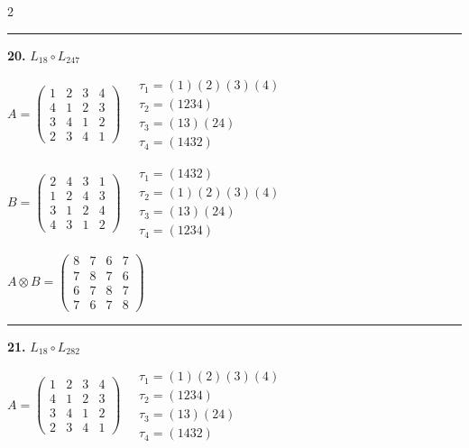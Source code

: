 \begin{multicols}{2}
\vspace{0.3em}
\hrule
\vspace{0.3em}

\noindent\textbf{20.} $L_{18} \circ L_{247}$

$A = \begin{pmatrix} 1 & 2 & 3 & 4 \\ 4 & 1 & 2 & 3 \\ 3 & 4 & 1 & 2 \\ 2 & 3 & 4 & 1 \end{pmatrix} \quad \begin{matrix} \tau_{1}=(1)(2)(3)(4) \\ \tau_{2}=(1 2 3 4) \\ \tau_{3}=(1 3)(2 4) \\ \tau_{4}=(1 4 3 2) \end{matrix}$

$B = \begin{pmatrix} 2 & 4 & 3 & 1 \\ 1 & 2 & 4 & 3 \\ 3 & 1 & 2 & 4 \\ 4 & 3 & 1 & 2 \end{pmatrix} \quad \begin{matrix} \tau_{1}=(1 4 3 2) \\ \tau_{2}=(1)(2)(3)(4) \\ \tau_{3}=(1 3)(2 4) \\ \tau_{4}=(1 2 3 4) \end{matrix}$

$A \otimes B = \begin{pmatrix} 8 & 7 & 6 & 7 \\ 7 & 8 & 7 & 6 \\ 6 & 7 & 8 & 7 \\ 7 & 6 & 7 & 8 \end{pmatrix}$

\vspace{0.3em}
\hrule
\vspace{0.3em}

\noindent\textbf{21.} $L_{18} \circ L_{282}$

$A = \begin{pmatrix} 1 & 2 & 3 & 4 \\ 4 & 1 & 2 & 3 \\ 3 & 4 & 1 & 2 \\ 2 & 3 & 4 & 1 \end{pmatrix} \quad \begin{matrix} \tau_{1}=(1)(2)(3)(4) \\ \tau_{2}=(1 2 3 4) \\ \tau_{3}=(1 3)(2 4) \\ \tau_{4}=(1 4 3 2) \end{matrix}$


\end{multicols}
